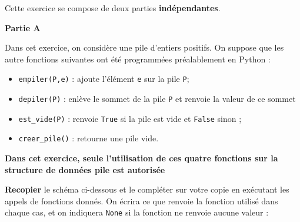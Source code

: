 \documentclass[11pt,a4paper]{article}
\begin{document}

Cette exercice se compose de deux parties \textbf{indépendantes}.

\vspace{0.2cm}
\large{\bf  Partie A}

Dans cet exercice, on considère une pile d'entiers positifs. On suppose que les autre fonctions suivantes ont été programmées préalablement en Python :
\begin{itemize}
    \item {\tt empiler(P,e)} : ajoute l'élément {\tt e} sur la pile {\tt P};
    \item {\tt depiler(P)} : enlève le sommet de la pile {\tt P} et renvoie la valeur de ce sommet
    \item {\tt est\_vide(P)} : renvoie {\tt True} si la pile est vide et {\tt False} sinon ;
    \item {\tt creer\_pile()} : retourne une pile vide.
\end{itemize}

\textbf{Dans cet exercice, seule l'utilisation de ces quatre fonctions sur la structure de données pile est autorisée}

\QListe
\item \textbf{Recopier} le schéma ci-dessous et le compléter sur votre copie en exécutant les appels de fonctions donnés. On écrira ce que renvoie la fonction utilisé dans chaque cas, et on indiquera {\tt None} si la fonction ne renvoie aucune valeur :
\end{document}
